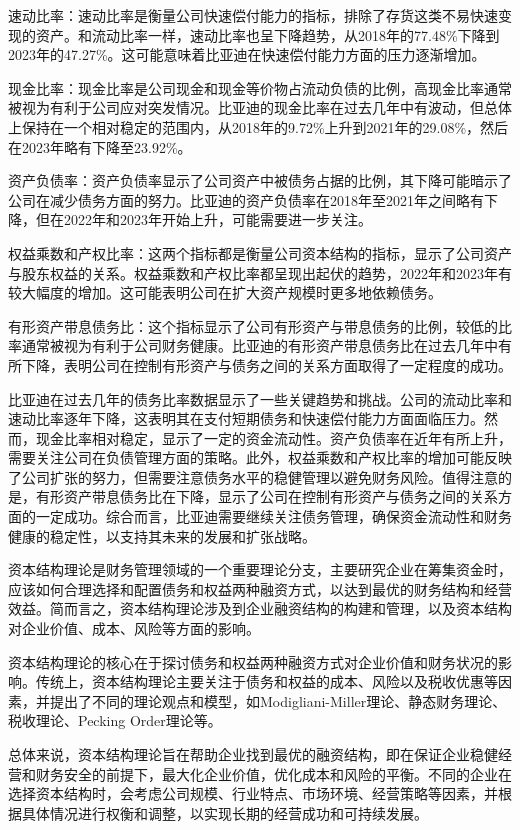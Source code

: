 速动比率：速动比率是衡量公司快速偿付能力的指标，排除了存货这类不易快速变现的资产。和流动比率一样，速动比率也呈下降趋势，从2018年的77.48\%下降到2023年的47.27\%。这可能意味着比亚迪在快速偿付能力方面的压力逐渐增加。

现金比率：现金比率是公司现金和现金等价物占流动负债的比例，高现金比率通常被视为有利于公司应对突发情况。比亚迪的现金比率在过去几年中有波动，但总体上保持在一个相对稳定的范围内，从2018年的9.72\%上升到2021年的29.08\%，然后在2023年略有下降至23.92\%。

资产负债率：资产负债率显示了公司资产中被债务占据的比例，其下降可能暗示了公司在减少债务方面的努力。比亚迪的资产负债率在2018年至2021年之间略有下降，但在2022年和2023年开始上升，可能需要进一步关注。

权益乘数和产权比率：这两个指标都是衡量公司资本结构的指标，显示了公司资产与股东权益的关系。权益乘数和产权比率都呈现出起伏的趋势，2022年和2023年有较大幅度的增加。这可能表明公司在扩大资产规模时更多地依赖债务。

有形资产带息债务比：这个指标显示了公司有形资产与带息债务的比例，较低的比率通常被视为有利于公司财务健康。比亚迪的有形资产带息债务比在过去几年中有所下降，表明公司在控制有形资产与债务之间的关系方面取得了一定程度的成功。

比亚迪在过去几年的债务比率数据显示了一些关键趋势和挑战。公司的流动比率和速动比率逐年下降，这表明其在支付短期债务和快速偿付能力方面面临压力。然而，现金比率相对稳定，显示了一定的资金流动性。资产负债率在近年有所上升，需要关注公司在负债管理方面的策略。此外，权益乘数和产权比率的增加可能反映了公司扩张的努力，但需要注意债务水平的稳健管理以避免财务风险。值得注意的是，有形资产带息债务比在下降，显示了公司在控制有形资产与债务之间的关系方面的一定成功。综合而言，比亚迪需要继续关注债务管理，确保资金流动性和财务健康的稳定性，以支持其未来的发展和扩张战略。


资本结构理论是财务管理领域的一个重要理论分支，主要研究企业在筹集资金时，应该如何合理选择和配置债务和权益两种融资方式，以达到最优的财务结构和经营效益。简而言之，资本结构理论涉及到企业融资结构的构建和管理，以及资本结构对企业价值、成本、风险等方面的影响。

资本结构理论的核心在于探讨债务和权益两种融资方式对企业价值和财务状况的影响。传统上，资本结构理论主要关注于债务和权益的成本、风险以及税收优惠等因素，并提出了不同的理论观点和模型，如Modigliani-Miller理论、静态财务理论、税收理论、Pecking Order理论等。

总体来说，资本结构理论旨在帮助企业找到最优的融资结构，即在保证企业稳健经营和财务安全的前提下，最大化企业价值，优化成本和风险的平衡。不同的企业在选择资本结构时，会考虑公司规模、行业特点、市场环境、经营策略等因素，并根据具体情况进行权衡和调整，以实现长期的经营成功和可持续发展。




